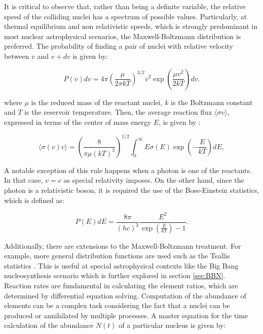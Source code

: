 \documentclass[openany]{book}
\begin{document}
It is critical to observe that, rather than being a definite variable, the relative speed of the colliding nuclei has a spectrum of possible values. Particularly, at thermal equilibrium and non relativistic speeds, which is strongly predominant in most nuclear astrophysical scenarios, the Maxwell-Boltzmann distribution is preferred. The probability of finding a pair of nuclei with relative velocity  between $v$ and $v + dv$ is given by:

\begin{equation} \label{eq:reactionRate_maxwellBoltzmann}
	P(v)dv = 4\pi \left( \frac{\mu}{2\pi kT}\right)^{3/2} v^2 \exp{\left({\frac{\mu v^2}{2kT}}\right)}dv.
\end{equation}


where $\mu$ is the reduced mass of the reactant nuclei,  $k$ is the Boltzmann constant and $T$ is the reservoir temperature. Then, the average reaction flux $\langle \sigma v \rangle $, expressed in terms of the center of mass energy $E$, is given by \cite{ueda_sargeant_pato_hussein_2004}:

\begin{equation}  \label{eq:reactionRate_definition}
	\langle \sigma(v) v \rangle = \left(\frac{8}{\pi \mu (kT)^3 }\right)^{1/2}  \int_0^{\infty} { E \sigma(E) \exp\left({-\frac{E}{kT}}\right)  dE},
\end{equation}


A notable exception of this rule happens when a photon is one of the reactants. In that case, $v = c$ as special relativity imposes. On the other hand, since the photon is a relativistic boson, it is required the use of the Bose-Einstein statistics, which is defined as:  

\begin{equation} \label{eq:reactionRate_boseEinstein}
	P(E)dE = \frac{8\pi}{(hc)^3} \frac{E^2}{\exp{\left(\frac{E}{kT}\right)} - 1}.
\end{equation}

Additionally, there are extensions to the Maxwell-Boltzmann treatment. For example, more general distribution functions are used such as the Tsallis statistics \cite{haubold_kumar_2008}. This is useful at special astrophysical contexts like the Big Bang nucleosynthesis scenario which is further explored in section \ref{sec:BBN}. \\

 Reaction rates are fundamental in calculating the element ratios, which are determined by differential equation solving. Computation of the abundance of elements can be a complex task considering the fact that a nuclei can be produced or annihilated by multiple processes. A master equation for the time calculation of the abundance $N(t)$ of a particular nucleus is given by:
 
\end{document}
